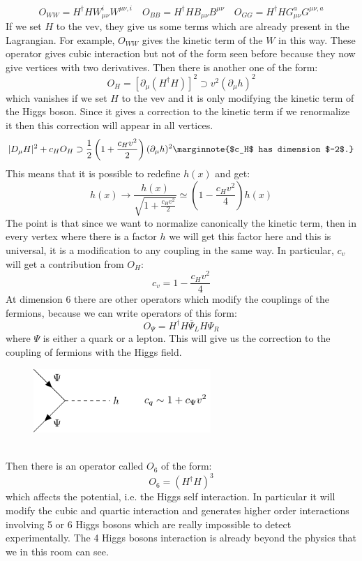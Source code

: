 \documentclass[../main.tex]{subfiles}
\begin{document}
\[
O_{WW}=H^\dagger HW_{\mu\nu}^iW^{\mu\nu,i} \quad O_{BB}=H^\dagger HB_{\mu\nu}B^{\mu\nu} \quad O_{GG}=H^\dagger HG_{\mu\nu}^aG^{\mu\nu,a}
\]
If we set $H$ to the vev, they give us some terms which are already present in the Lagrangian. For example, $O_{WW}$ gives the kinetic term of the $W$ in this way. These operator gives cubic interaction but not of the form seen before because they now give vertices with two derivatives.
Then there is another one of the form:
\[
O_H=[\partial_\mu(H^\dagger H)]^2\supset v^2(\partial_\mu h)^2
\]
which vanishes if we set $H$ to the vev and it is only modifying the kinetic term of the Higgs boson. Since it gives a correction to the kinetic term if we renormalize it then this correction will appear in all vertices.
\[
|D_\mu H|^2+c_HO_H\supset\frac{1}{2}\left(1+\frac{c_Hv^2}{2}\right)(\partial_\mu h)^2\marginnote{$c_H$ has dimension $-2$.}
\]
This means that it is possible to redefine $h(x)$ and get:
\[
h(x)\to\frac{h(x)}{\sqrt{1+\frac{c_Hv^2}{2}}}\simeq\left(1-\frac{c_Hv^2}{4}\right)h(x)
\]
The point is that since we want to normalize canonically the kinetic term, then in every vertex where there is a factor $h$ we will get this factor here and this is universal, it is a modification to any coupling in the same way. In particular, $c_v$ will get a contribution from $O_H$:
\[
c_v=1-\frac{c_Hv^2}{4}
\]
At dimension 6 there are other operators which modify the couplings of the fermions, because we can write operators of this form:
\[
O_\Psi=H^\dagger H\overline{\Psi}_LH\Psi_R
\]
where $\Psi$ is either a quark or a lepton. This will give us the correction to the coupling of fermions with the Higgs field.
\begin{figure}[h]
    \centering
    \includegraphics[width=0.6\textwidth]{Images/cq.pdf}
    \caption*{}
\end{figure}\\
Then there is an operator called $O_6$ of the form:
\[
O_6=(H^\dagger H)^3
\]
which affects the potential, i.e. the Higgs self interaction. In particular it will modify the cubic and quartic interaction and generates higher order interactions involving 5 or 6 Higgs bosons which are really impossible to detect experimentally. The 4 Higgs bosons interaction is already beyond the physics that we in this room can see.\\
\end{document}
